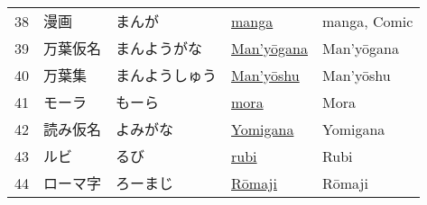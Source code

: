 \begin{longtable}[c]{p{.5cm}p{3.5cm}p{4cm}p{3.5cm}p{3.5cm}}
38&漫画&まんが&\hyperref[sec:Manga]{manga}&manga, Comic\\
39&万葉仮名&まんようがな&\hyperref[sec:Manyogana]{Man'yōgana}&Man'yōgana\\
40&万葉集&まんようしゅう&\hyperref[sec:Manyoshu]{Man'yōshu}&Man'yōshu\\
41&モーラ&もーら&\hyperref[sec:Mora]{mora}&Mora\\
42&読み仮名&よみがな&\hyperref[sec:Yomigana]{Yomigana}&Yomigana\\
43&ルビ&るび&\hyperref[sec:Rubi]{rubi}&Rubi\\
44&ローマ字&ろーまじ&\hyperref[sec:Romaji]{Rōmaji}&Rōmaji\\
\end{longtable}
